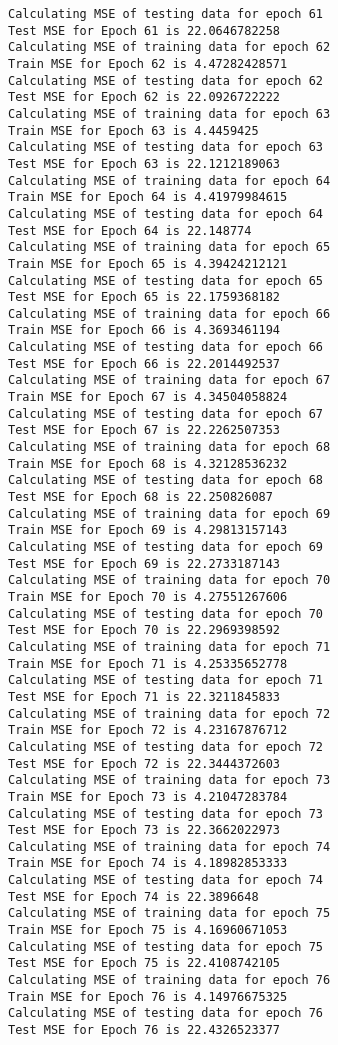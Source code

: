 \documentclass{article}
\begin{document}
\begin{Verbatim}[commandchars=\\\{\}]
Calculating MSE of testing data for epoch 61
Test MSE for Epoch 61 is 22.0646782258
Calculating MSE of training data for epoch 62
Train MSE for Epoch 62 is 4.47282428571
Calculating MSE of testing data for epoch 62
Test MSE for Epoch 62 is 22.0926722222
Calculating MSE of training data for epoch 63
Train MSE for Epoch 63 is 4.4459425
Calculating MSE of testing data for epoch 63
Test MSE for Epoch 63 is 22.1212189063
Calculating MSE of training data for epoch 64
Train MSE for Epoch 64 is 4.41979984615
Calculating MSE of testing data for epoch 64
Test MSE for Epoch 64 is 22.148774
Calculating MSE of training data for epoch 65
Train MSE for Epoch 65 is 4.39424212121
Calculating MSE of testing data for epoch 65
Test MSE for Epoch 65 is 22.1759368182
Calculating MSE of training data for epoch 66
Train MSE for Epoch 66 is 4.3693461194
Calculating MSE of testing data for epoch 66
Test MSE for Epoch 66 is 22.2014492537
Calculating MSE of training data for epoch 67
Train MSE for Epoch 67 is 4.34504058824
Calculating MSE of testing data for epoch 67
Test MSE for Epoch 67 is 22.2262507353
Calculating MSE of training data for epoch 68
Train MSE for Epoch 68 is 4.32128536232
Calculating MSE of testing data for epoch 68
Test MSE for Epoch 68 is 22.250826087
Calculating MSE of training data for epoch 69
Train MSE for Epoch 69 is 4.29813157143
Calculating MSE of testing data for epoch 69
Test MSE for Epoch 69 is 22.2733187143
Calculating MSE of training data for epoch 70
Train MSE for Epoch 70 is 4.27551267606
Calculating MSE of testing data for epoch 70
Test MSE for Epoch 70 is 22.2969398592
Calculating MSE of training data for epoch 71
Train MSE for Epoch 71 is 4.25335652778
Calculating MSE of testing data for epoch 71
Test MSE for Epoch 71 is 22.3211845833
Calculating MSE of training data for epoch 72
Train MSE for Epoch 72 is 4.23167876712
Calculating MSE of testing data for epoch 72
Test MSE for Epoch 72 is 22.3444372603
Calculating MSE of training data for epoch 73
Train MSE for Epoch 73 is 4.21047283784
Calculating MSE of testing data for epoch 73
Test MSE for Epoch 73 is 22.3662022973
Calculating MSE of training data for epoch 74
Train MSE for Epoch 74 is 4.18982853333
Calculating MSE of testing data for epoch 74
Test MSE for Epoch 74 is 22.3896648
Calculating MSE of training data for epoch 75
Train MSE for Epoch 75 is 4.16960671053
Calculating MSE of testing data for epoch 75
Test MSE for Epoch 75 is 22.4108742105
Calculating MSE of training data for epoch 76
Train MSE for Epoch 76 is 4.14976675325
Calculating MSE of testing data for epoch 76
Test MSE for Epoch 76 is 22.4326523377

\end{Verbatim}
\end{document}
